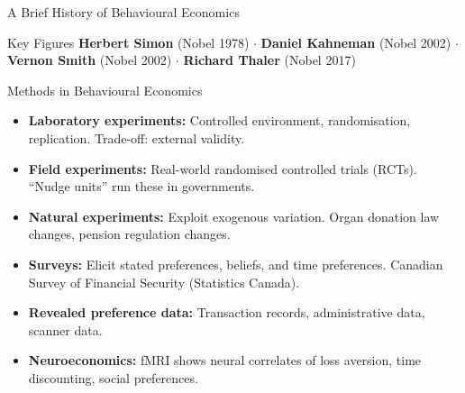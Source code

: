 \documentclass[aspectratio=169]{beamer}
\begin{document}
\begin{frame}{A Brief History of Behavioural Economics}
\begin{exampleblock}{Key Figures}
\textbf{Herbert Simon} (Nobel 1978) $\cdot$ \textbf{Daniel Kahneman} (Nobel 2002) $\cdot$ \textbf{Vernon Smith} (Nobel 2002) $\cdot$ \textbf{Richard Thaler} (Nobel 2017)
\end{exampleblock}
\end{frame}

\begin{frame}{Methods in Behavioural Economics}
\begin{itemize}[<+->]
  \item \textbf{Laboratory experiments:} Controlled environment, randomisation, replication. Trade-off: external validity.
  \item \textbf{Field experiments:} Real-world randomised controlled trials (RCTs). ``Nudge units'' run these in governments.
  \item \textbf{Natural experiments:} Exploit exogenous variation. Organ donation law changes, pension regulation changes.
  \item \textbf{Surveys:} Elicit stated preferences, beliefs, and time preferences. Canadian Survey of Financial Security (Statistics Canada).
  \item \textbf{Revealed preference data:} Transaction records, administrative data, scanner data.
  \item \textbf{Neuroeconomics:} fMRI shows neural correlates of loss aversion, time discounting, social preferences.
\end{itemize}
\end{frame}
\end{document}
